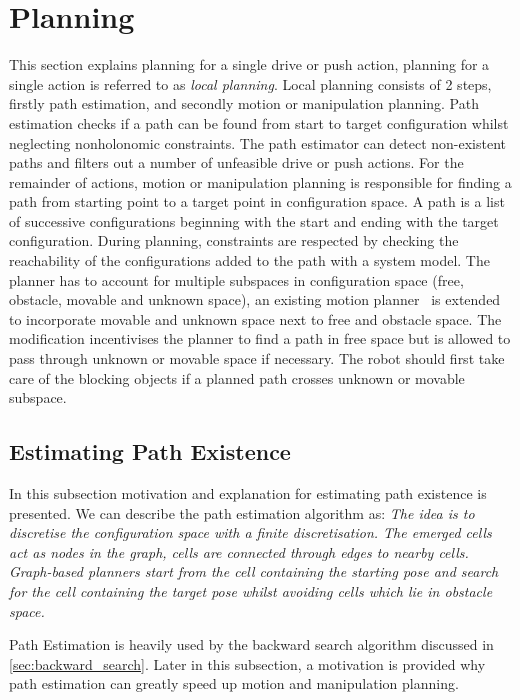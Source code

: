 \section{Planning}%
\label{sec:planning}
This section explains planning for a single drive or push action, planning for a single action is referred to as \textit{local planning}. Local planning consists of 2 steps, firstly path estimation, and secondly motion or manipulation planning. Path estimation checks if a path can be found from start to target configuration whilst neglecting nonholonomic constraints. The path estimator can detect non-existent paths and filters out a number of unfeasible drive or push actions. For the remainder of actions, motion or manipulation planning is responsible for finding a path from starting point to a target point in configuration space. A path is a list of successive configurations beginning with the start and ending with the target configuration. During planning, constraints are respected by checking the reachability of the configurations added to the path with a system model. The planner has to account for multiple subspaces in configuration space (free, obstacle, movable and unknown space), an existing motion planner~\cite{chen_fast_2018} is extended to incorporate movable and unknown space next to free and obstacle space. The modification incentivises the planner to find a path in free space but is allowed to pass through unknown or movable space if necessary. The robot should first take care of the blocking objects if a planned path crosses unknown or movable subspace.\bs

\subsection{Estimating Path Existence}%
\label{subsec:path_estimation}
In this subsection motivation and explanation for estimating path existence is presented. We can describe the path estimation algorithm as: \textit{The idea is to discretise the configuration space with a finite discretisation. The emerged cells act as nodes in the graph, cells are connected through edges to nearby cells. Graph-based planners start from the cell containing the starting pose and search for the cell containing the target pose whilst avoiding cells which lie in obstacle space.\bs}

Path Estimation is heavily used by the backward search algorithm discussed in \cref{sec:backward_search}. Later in this subsection, a motivation is provided why path estimation can greatly speed up motion and manipulation planning.

